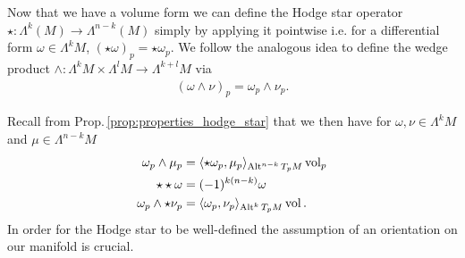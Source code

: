 \documentclass[../main.tex]{subfiles}
\begin{document}


Now that we have a volume form we can define the Hodge star operator
$\star: \Lambda^k(M) \rightarrow \Lambda^{n-k}(M)$ 
simply by applying it 
pointwise i.e. for a differential form $\omega \in \Lambda^k M$, $(\star \omega)_p = \star \omega_p$. 
We follow the analogous idea to define the wedge product
$\wedge: \Lambda^k M \times \Lambda^l M \rightarrow \Lambda^{k+l} M$ via
\begin{align*}
    (\omega \wedge \nu )_p = \omega_p \wedge \nu_p. 
\end{align*} 

Recall from Prop.\,\ref{prop:properties_hodge_star} that we then have for $\omega, \nu \in \Lambda^k M$ and 
$\mu \in \Lambda^{n-k} M$
\begin{align*}
    \omega_p \wedge \mu_p &= \langle \star \omega_p, \mu_p \rangle _{{\text{Alt}^{n-k}\,T_p M}} \operatorname{vol}_p
    \\ \star \star \omega &= (-1)^{k(n-k)} \omega
    \\ \omega_p \wedge \star \nu_p &= \langle \omega_p, \nu_p \rangle _{{\text{Alt}^{k}\,T_p M}} \operatorname{vol}.
\end{align*}
In order for 
the Hodge star to be well-defined the assumption of an orientation on our 
manifold is crucial. 
\end{document}
